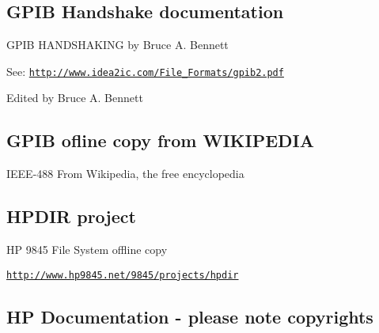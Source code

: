 \subsection*{G\+P\+IB Handshake documentation}


\begin{DoxyItemize}
\item G\+P\+IB H\+A\+N\+D\+S\+H\+A\+K\+I\+NG by Bruce A. Bennett
\begin{DoxyItemize}
\item See\+: \href{http://www.idea2ic.com/File_Formats/gpib2.pdf}{\tt http\+://www.\+idea2ic.\+com/\+File\+\_\+\+Formats/gpib2.\+pdf}
\begin{DoxyItemize}
\item Edited by Bruce A. Bennett
\end{DoxyItemize}
\end{DoxyItemize}
\end{DoxyItemize}





\subsection*{G\+P\+IB ofline copy from W\+I\+K\+I\+P\+E\+D\+IA}


\begin{DoxyItemize}
\item I\+E\+E\+E-\/488 From Wikipedia, the free encyclopedia
\end{DoxyItemize}





\subsection*{H\+P\+D\+IR project}


\begin{DoxyItemize}
\item HP 9845 File System offline copy
\begin{DoxyItemize}
\item \href{http://www.hp9845.net/9845/projects/hpdir}{\tt http\+://www.\+hp9845.\+net/9845/projects/hpdir}
\end{DoxyItemize}
\end{DoxyItemize}





\subsection*{HP Documentation -\/ please note copyrights}


